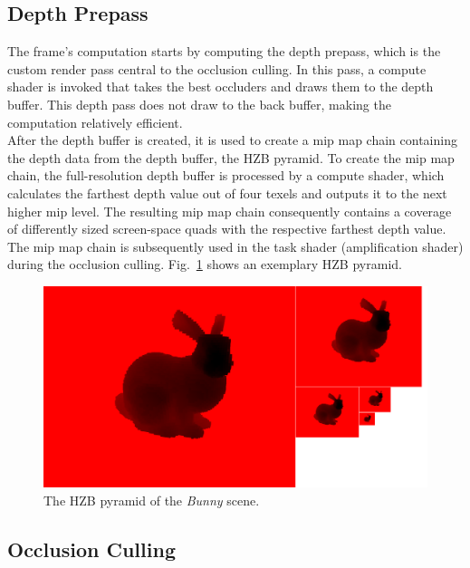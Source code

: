 \documentclass[conference]{IEEEtran}
\begin{document}
\subsection{Depth Prepass} \label{sec-depth-prepass}

\noindent
The frame's computation starts by computing the depth prepass, which is the custom
render pass central to the occlusion culling. In this pass, a compute shader is invoked
that takes the best occluders and draws them to the depth buffer. This depth pass does
not draw to the back buffer, making the computation relatively efficient. \\

\noindent
After the depth buffer is created, it is used to create a mip map chain containing the depth 
data from the depth buffer, the \ac{HZB} pyramid. To create the mip map chain, the full-resolution 
depth buffer is processed by a compute shader, which calculates the farthest depth value out 
of four texels and outputs it to the next higher mip level. The resulting mip map chain consequently 
contains a coverage of differently sized screen-space quads with the respective farthest depth 
value. The mip map chain is subsequently used in the task shader (amplification shader) during the 
occlusion culling. Fig.~\ref{fig:hzb-pyramid-viz} shows an exemplary \ac{HZB} pyramid.

\begin{figure}
    \includegraphics[width=\linewidth]{images/hiz-pyramid.png}
    \caption{The \ac{HZB} pyramid of the \emph{Bunny} scene.}
    \label{fig:hzb-pyramid-viz}
\end{figure}

\subsection{Occlusion Culling} \label{sec-occlusion-culling}
\end{document}
